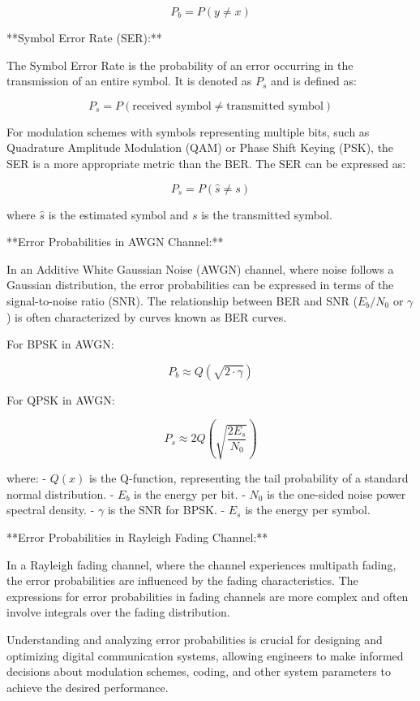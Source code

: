 \documentclass[../../../../DMCC-My-Notebook]{subfiles}
\begin{document}
	\[ P_b = P(y \neq x) \]
	
	**Symbol Error Rate (SER):**
	
	The Symbol Error Rate is the probability of an error occurring in the transmission of an entire symbol. It is denoted as \(P_s\) and is defined as:
	
	\[ P_s = P(\text{received symbol} \neq \text{transmitted symbol}) \]
	
	For modulation schemes with symbols representing multiple bits, such as Quadrature Amplitude Modulation (QAM) or Phase Shift Keying (PSK), the SER is a more appropriate metric than the BER. The SER can be expressed as:
	
	\[ P_s = P(\hat{s} \neq s) \]
	
	where \(\hat{s}\) is the estimated symbol and \(s\) is the transmitted symbol.
	
	**Error Probabilities in AWGN Channel:**
	
	In an Additive White Gaussian Noise (AWGN) channel, where noise follows a Gaussian distribution, the error probabilities can be expressed in terms of the signal-to-noise ratio (SNR). The relationship between BER and SNR (\(E_b/N_0\) or \(\gamma\)) is often characterized by curves known as BER curves.
	
	For BPSK in AWGN:
	
	\[ P_b \approx Q\left(\sqrt{2 \cdot \gamma}\right) \]
	
	For QPSK in AWGN:
	
	\[ P_s \approx 2Q\left(\sqrt{\frac{2E_s}{N_0}}\right) \]
	
	where:
	- \( Q(x) \) is the Q-function, representing the tail probability of a standard normal distribution.
	- \( E_b \) is the energy per bit.
	- \( N_0 \) is the one-sided noise power spectral density.
	- \( \gamma \) is the SNR for BPSK.
	- \( E_s \) is the energy per symbol.
	
	**Error Probabilities in Rayleigh Fading Channel:**
	
	In a Rayleigh fading channel, where the channel experiences multipath fading, the error probabilities are influenced by the fading characteristics. The expressions for error probabilities in fading channels are more complex and often involve integrals over the fading distribution.
	
	Understanding and analyzing error probabilities is crucial for designing and optimizing digital communication systems, allowing engineers to make informed decisions about modulation schemes, coding, and other system parameters to achieve the desired performance.
	
\end{document}
